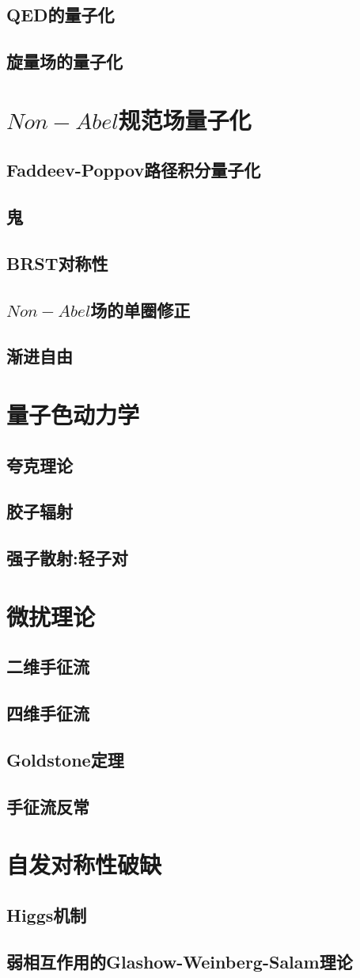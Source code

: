\documentclass{book}
\begin{document}
\section{QED的量子化}
\section{旋量场的量子化}
\chapter{$Non-Abel$规范场量子化}
\section{Faddeev-Poppov路径积分量子化}
\section{鬼}
\section{BRST对称性}
\section{$Non-Abel$场的单圈修正}
\section{渐进自由}
\chapter{量子色动力学}
\section{夸克理论}
\section{胶子辐射}
\section{强子散射:轻子对}
\chapter{微扰理论}
\section{二维手征流}
\section{四维手征流}
\section{Goldstone定理}
\section{手征流反常}
\chapter{自发对称性破缺}
\section{Higgs机制}
\section{弱相互作用的Glashow-Weinberg-Salam理论}
\end{document}
